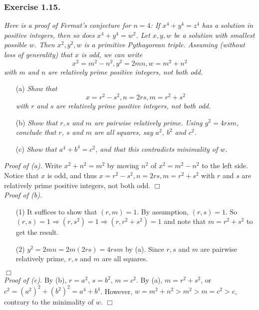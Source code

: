 \documentclass{article}
\begin{document}



\subsubsection*{Exercise 1.15.}
\emph{Here is a proof of Fermat's conjecture for $n = 4$:
If $x^4 + y^4 = z^4$ has a solution in positive integers,
then so does $x^4 + y^4 = w^2$.
Let $x,y,w$ be a solution with smallest possible $w$.
Then $x^2, y^2, w$ is a primitive Pythagorean triple.
Assuming (without loss of generality) that $x$ is odd,
we can write
$$x^2 = m^2-n^2, y^2 = 2mn, w = m^2+n^2$$
with $m$ and $n$ are relatively prime positive integers, not both odd. }
\begin{enumerate}
\item[(a)]
\emph{Show that
$$x=r^2-s^2, n=2rs, m=r^2+s^2$$
with $r$ and $s$ are relatively prime positive integers, not both odd. }
\item[(b)]
\emph{Show that $r,s$ and $m$ are pairwise relatively prime.
Using $y^2 = 4rsm$, conclude that $r$, $s$ and $m$ are all squares, say
$a^2$, $b^2$ and $c^2$. }
\item[(c)]
\emph{Show that $a^4+b^4=c^2$, and that this contradicts minimality of $w$. } \\
\end{enumerate}

\emph{Proof of (a).}
Write $x^2+n^2=m^2$ by moving $n^2$ of $x^2 = m^2-n^2$ to the left side.
Notice that $x$ is odd, and thus
$x=r^2-s^2, n=2rs, m=r^2+s^2$
with $r$ and $s$ are relatively prime positive integers, not both odd.
$\Box$ \\

\emph{Proof of (b).}
\begin{enumerate}
\item[(1)]
It suffices to show that $(r,m) = 1$.
By assumption, $(r,s)=1$.
So
$(r,s) = 1 \Rightarrow (r,s^2) = 1 \Rightarrow (r,r^2+s^2) = 1$
and note that $m=r^2+s^2$ to get the result.
\item[(2)]
$y^2 = 2mn = 2m(2rs) = 4rsm$ by (a).
Since $r,s$ and $m$ are pairwise relatively prime,
$r,s$ and $m$ are all squares.
\end{enumerate}
$\Box$ \\

\emph{Proof of (c).}
By (b), $r=a^2$, $s=b^2$, $m=c^2$.
By (a), $m=r^2+s^2$, or $c^2 = (a^2)^2 + (b^2)^2 = a^4 + b^4$.
However, $w = m^2+n^2 > m^2 > m = c^2 > c$, contrary to the minimality of $w$.
$\Box$ \\\\
\end{document}
